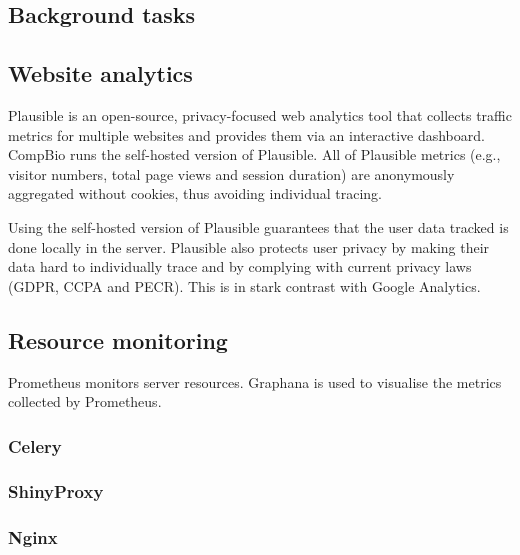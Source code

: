 \subsection{Background tasks}



\subsection{Website analytics}

Plausible is an open-source, privacy-focused web analytics tool that collects traffic metrics for multiple websites and provides them via an interactive dashboard. CompBio runs the self-hosted version of Plausible. All of Plausible metrics (e.g., visitor numbers, total page views and session duration) are anonymously aggregated without cookies, thus avoiding individual tracing.


Using the self-hosted version of Plausible guarantees that the user data tracked is done locally in the server. Plausible also protects user privacy by making their data hard to individually trace and by complying with current privacy laws (GDPR, CCPA and PECR). This is in stark contrast with Google Analytics.

\subsection{Resource monitoring}

Prometheus monitors server resources. Graphana is used to visualise the metrics collected by Prometheus.

\subsubsection{Celery}

\subsubsection{ShinyProxy}

\subsubsection{Nginx}

